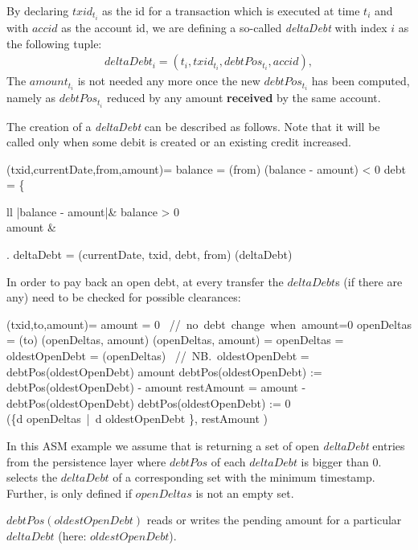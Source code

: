 By declaring $txid_{t_i}$ as the id for a transaction which is executed at time $t_i$ and with $accid$ as the account id, we are defining a so-called \textit{deltaDebt} with index $i$ as the following tuple:
\begin{align}
	deltaDebt_i = (t_i, txid_{t_i}, debtPos_{t_i}, accid),
\end{align}
The $amount_{t_i}$ is not needed any more once the new $debtPos_{t_i}$ has been computed, namely as $debtPos_{t_i}$ reduced by any amount \textbf{received} by the same account.

The creation of a \textit{deltaDebt} can be described as follows. Note that it will be called only when some debit is created or an existing credit increased.

\begin{asm}
	(txid,currentDate,from,amount)=\+
		\LET balance = (from)\+
			\IF (balance - amount) < 0 \THEN\+
				\LET debt =  \+\left\{\begin{array}{ll}
						|balance - amount|\+& \IF balance > 0\\
						amount & \ELSE
					\end{array}\right.\-\-
				\LET deltaDebt = (currentDate, txid, debt, from)\+
					(deltaDebt)
\end{asm}

In order to pay back an open debt, at every transfer the $deltaDebt$s (if there are any) need to be checked for possible clearances:

\begin{asm}
	(txid,to,amount)=\+
	\IF amount \not = 0 \THEN \mbox{  // no debt change when }amount=0\+	    
		\LET openDeltas = (to)\+
		   (openDeltas, amount) \dec\dec\-
	\WHERE \+
		(openDeltas, amount) =\+
			\IF openDeltas \not = \emptyset \THEN\+
				\LET oldestOpenDebt = (openDeltas) \mbox{  // NB. }oldestOpenDebt \not =\ \UNDEF\\
				\IF debtPos(oldestOpenDebt) \ge amount \THEN\+
					debtPos(oldestOpenDebt) := debtPos(oldestOpenDebt) - amount\-
				\ELSE \+
					\LET restAmount = amount - debtPos(oldestOpenDebt)\+
						debtPos(oldestOpenDebt) := 0\\
						(\{d \in openDeltas\ |\ d \neq oldestOpenDebt \}, restAmount )\dec\dec\dec\-
\end{asm}


In this ASM example we assume that  is returning a set of open \textit{deltaDebt} entries from the persistence layer where $debtPos$ of each $deltaDebt$ is bigger than $0$.  selects the $deltaDebt$ of a corresponding set with the minimum timestamp. Further,  is only defined if $openDeltas$ is not an empty set.

$debtPos(oldestOpenDebt)$ reads or writes the pending amount for a particular $deltaDebt$ (here: $oldestOpenDebt$).









